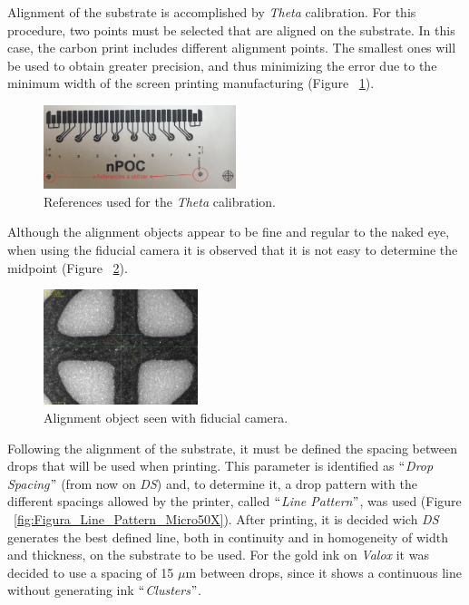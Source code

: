 Alignment of the substrate is accomplished by \textit{Theta} calibration. For this procedure, two points must be selected that are aligned on the substrate. In this case, the carbon print includes different alignment points. The smallest ones will be used to obtain greater precision, and thus minimizing the error due to the minimum width of the screen printing manufacturing (Figure ~\ref{fig:Figura_alineacion_theta}).

\begin{figure}[H]
  \centering
    \includegraphics[width=0.5\textwidth]{Figures/Figura_alineacion_theta}
  \caption{References used for the \textit{Theta} calibration.}
  \label{fig:Figura_alineacion_theta}
\end{figure}

Although the alignment objects appear to be fine and regular to the naked eye, when using the fiducial camera it is observed that it is not easy to determine the midpoint (Figure ~\ref{fig:Figura_alineacion_theta2}).

\begin{figure}[H]
  \centering
    \includegraphics[width=0.4\textwidth]{Figures/Figura_alineacion_theta2}
  \caption{Alignment object seen with fiducial camera.}
  \label{fig:Figura_alineacion_theta2}
\end{figure}

Following the alignment of the substrate, it must be defined the spacing between drops that will be used when printing. This parameter is identified as $``$\textit{Drop Spacing}$"$ (from now on \emph{DS}) and, to determine it, a drop pattern with the different spacings allowed by the printer, called $``$\textit{Line Pattern}$"$, was used (Figure ~\ref{fig:Figura_Line_Pattern_Micro50X}). After printing, it is decided wich \emph{DS} generates the best defined line, both in continuity and in homogeneity of width and thickness, on the substrate to be used. For the gold ink on \textit{Valox} it was decided to use a spacing of 15 $\mu$m between drops, since it shows a continuous line without generating ink $``$\textit{Clusters}$"$.

